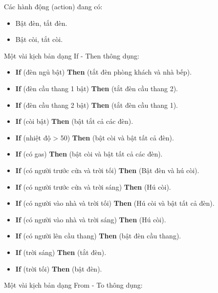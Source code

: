 \documentclass[12pt,a4paper,oneside]{extbook}
\begin{document}
\noindent
Các hành động (action) đang có:

\begin{itemize}[topsep=1mm,itemsep=-0.5mm]
\item Bật đèn, tắt đèn.
\item Bật còi, tắt còi.
\vspace{1mm}
\end{itemize}

\noindent
Một vài kịch bản dạng If - Then thông dụng:

\begin{itemize}[topsep=1mm,itemsep=-0.5mm]
\item \textbf{If} (đèn ngủ bật) \textbf{Then} (tắt đèn phòng khách và nhà bếp).
\item \textbf{If} (đèn cầu thang 1 bật) \textbf{Then} (tắt đèn cầu thang 2).
\item \textbf{If} (đèn cầu thang 2 bật) \textbf{Then} (tắt đèn cầu thang 1).
\item \textbf{If} (còi bật) \textbf{Then} (bật tắt cả các đèn).
\item \textbf{If} (nhiệt độ > 50) \textbf{Then} (bật còi và bật tất cả đèn).
\item \textbf{If} (có gas) \textbf{Then} (bật còi và bật tất cả các đèn).
\item \textbf{If} (có người trước cửa và trời tối) \textbf{Then} (Bật đèn và hú còi).
\item \textbf{If} (có người trước cửa và trời sáng) \textbf{Then} (Hú còi).
\item \textbf{If} (có người vào nhà và trời tối) \textbf{Then} (Hú còi và bật tất cả đèn).
\item \textbf{If} (có người vào nhà và trời sáng) \textbf{Then} (Hú còi).
\item \textbf{If} (có người lên cầu thang) \textbf{Then} (bật đèn cầu thang).
\item \textbf{If} (trời sáng) \textbf{Then} (tắt đèn).
\item \textbf{If} (trời tối) \textbf{Then} (bật đèn).
\vspace{1mm}
\end{itemize}

\noindent
Một vài kịch bản dạng From - To thông dụng:
\end{document}
